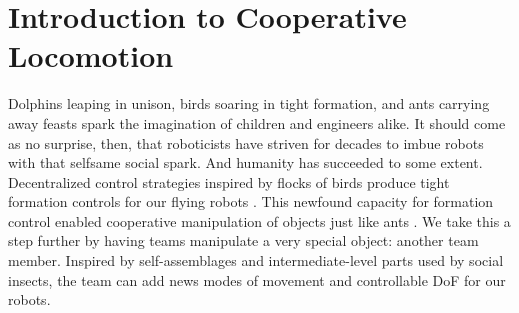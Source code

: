\documentclass[letterpaper]{report}
\begin{document}
\section{Introduction to Cooperative Locomotion}
Dolphins leaping in unison, birds soaring in tight formation, and ants carrying away feasts spark the imagination of children and engineers alike.
It should come as no surprise, then, that roboticists have striven for decades to imbue robots with that selfsame social spark.
And humanity has succeeded to some extent.
Decentralized control strategies inspired by flocks of birds \cite{reynolds1987flocks} produce tight formation controls for our flying robots \cite{RealBoids}.
This newfound capacity for formation control enabled cooperative manipulation of objects \cite{rus1995moving,sugar2002control,spletzer2001cooperative,song2002potential} just like ants \cite{kube2000cooperative}.
We take this a step further by having teams manipulate a very special object: another team member.
Inspired by self-assemblages \cite{Anderson2002} and intermediate-level parts \cite{Anderson2001} used by social insects, the team can add news modes of movement and controllable DoF for our robots.
\end{document}
